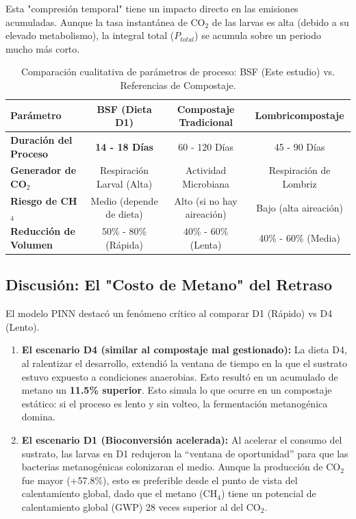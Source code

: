 Esta "compresión temporal" tiene un impacto directo en las emisiones acumuladas. Aunque la tasa instantánea de CO$_2$ de las larvas es alta (debido a su elevado metabolismo), la integral total ($P_{total}$) se acumula sobre un periodo mucho más corto.

\begin{table}[h!]
    \centering
    \caption{Comparación cualitativa de parámetros de proceso: BSF (Este estudio) vs. Referencias de Compostaje.}
    \label{tab:comparacion_tecnologias}
    \begin{tabular}{lccc}
        \hline
        \textbf{Parámetro} & \textbf{BSF (Dieta D1)} & \textbf{Compostaje Tradicional} & \textbf{Lombricompostaje} \\ \hline
        \textbf{Duración del Proceso} & \textbf{14 - 18 Días} & 60 - 120 Días & 45 - 90 Días \\
        \textbf{Generador de CO$_2$} & Respiración Larval (Alta) & Actividad Microbiana & Respiración de Lombriz \\
        \textbf{Riesgo de CH$_4$} & Medio (depende de dieta) & Alto (si no hay aireación) & Bajo (alta aireación) \\
        \textbf{Reducción de Volumen} & 50\% - 80\% (Rápida) & 40\% - 60\% (Lenta) & 40\% - 60\% (Media) \\ \hline
    \end{tabular}
\end{table}

\subsection{Discusión: El "Costo de Metano" del Retraso}

El modelo PINN destacó un fenómeno crítico al comparar D1 (Rápido) vs D4 (Lento). 

\begin{enumerate}
    \item \textbf{El escenario D4 (similar al compostaje mal gestionado):} La dieta D4, al ralentizar el desarrollo, extendió la ventana de tiempo en la que el sustrato estuvo expuesto a condiciones anaerobias. Esto resultó en un acumulado de metano un \textbf{11.5\% superior}. Esto simula lo que ocurre en un compostaje estático: si el proceso es lento y sin volteo, la fermentación metanogénica domina.
    
    \item \textbf{El escenario D1 (Bioconversión acelerada):} Al acelerar el consumo del sustrato, las larvas en D1 redujeron la ``ventana de oportunidad'' para que las bacterias metanogénicas colonizaran el medio. Aunque la producción de CO$_2$ fue mayor (+57.8\%), esto es preferible desde el punto de vista del calentamiento global, dado que el metano (CH$_4$) tiene un potencial de calentamiento global (GWP) 28 veces superior al del CO$_2$.
\end{enumerate}

